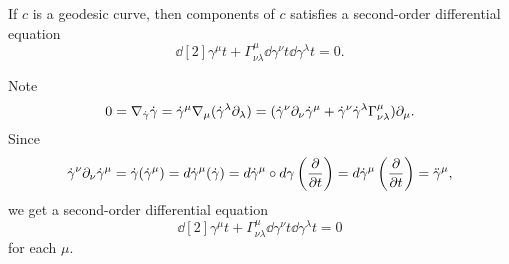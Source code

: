 \documentclass{../crs}
\begin{document}
\section{}

\begin{thm}
If $c$ is a geodesic curve, then components of $c$ satisfies a second-order differential equation
\[\dd[2]{\gamma^\mu}{t}+\Gamma_{\nu\lambda}^\mu\dd{\gamma^\nu}{t}\dd{\gamma^\lambda}{t}=0.\]
\end{thm}
\begin{pf}
Note
\[0=\nabla_{\dot\gamma}\dot\gamma=\dot\gamma^\mu\nabla_\mu(\dot\gamma^\lambda\pd_\lambda)
=(\dot\gamma^\nu\pd_\nu\dot\gamma^\mu+\dot\gamma^\nu\dot\gamma^\lambda\Gamma_{\nu\lambda}^\mu)\pd_\mu.\]
Since
\[\dot\gamma^\nu\pd_\nu\dot\gamma^\mu=\dot\gamma(\dot\gamma^\mu)=d\dot\gamma^\mu(\dot\gamma)=d\dot\gamma^\mu\circ d\gamma\left(\pd{t}\right)=d\dot\gamma^\mu\left(\pd{t}\right)=\ddot\gamma^\mu,\]
we get a second-order differential equation
\[\dd[2]{\gamma^\mu}{t}+\Gamma_{\nu\lambda}^\mu\dd{\gamma^\nu}{t}\dd{\gamma^\lambda}{t}=0\]
for each $\mu$.
\end{pf}
\end{document}
